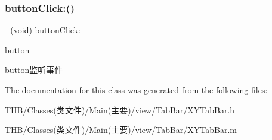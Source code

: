 \subsubsection{\texorpdfstring{button\+Click\+:()}{buttonClick:()}}
{\footnotesize\ttfamily -\/ (void) button\+Click\+: \begin{DoxyParamCaption}\item[{(\mbox{\hyperlink{interface_x_y_tab_bar_button}{X\+Y\+Tab\+Bar\+Button}}$\ast$)}]{button }\end{DoxyParamCaption}}

button监听事件 

The documentation for this class was generated from the following files\+:\begin{DoxyCompactItemize}
\item 
T\+H\+B/\+Classes(类文件)/\+Main(主要)/view/\+Tab\+Bar/X\+Y\+Tab\+Bar.\+h\item 
T\+H\+B/\+Classes(类文件)/\+Main(主要)/view/\+Tab\+Bar/X\+Y\+Tab\+Bar.\+m\end{DoxyCompactItemize}
